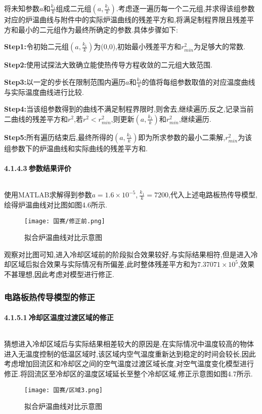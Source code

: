 \documentclass[12pt]{ctexart}
\numberwithin{figure}{section}
\numberwithin{table}{section}
\begin{document}
将未知参数$a$和$\frac{k_1}{k}$组成二元组$(a,\frac{k_1}{k})$.考虑逐一遍历每一个二元组,并求得该组参数对应的炉温曲线与附件中的实际炉温曲线的残差平方和,将满足制程界限且残差平方和最小的二元组作为最终所确定的参数.具体步骤如下:\

\textbf{Step1:}令初始二元组$(a,\frac{k_1}{k})$为(0,0),初始最小残差平方和$r^2_{min}$为足够大的常数.

\textbf{Step2:}使用试探法大致确立能使热传导方程收敛的二元组大致范围.

\textbf{Step3:}以一定的步长在限制范围内遍历$a$和$\frac{k_1}{k}$的值将每组参数取值的对应温度曲线与实际温度曲线进行比较.

\textbf{Step4:}当该组参数得到的曲线不满足制程界限时,则舍去,继续遍历;反之,记录当前二曲线的残差平方和$r^2$,若$r^2<r^2_{min}$,则更新$(a,\frac{k_1}{k})$和$r^2_{min}$,继续遍历.

\textbf{Step5:}所有遍历结束后,最终所得的$(a,\frac{k_1}{k})$即为所求参数的最小二乘解,$r^2_{min}$为该组参数下的炉温曲线和实际曲线的残差平方和.


\paragraph{4.1.4.3$\ $参数结果评价}$\ $

使用MATLAB求解得到参数$a=1.6\times10^{-5}$,$\ \frac{k_1}{k}=7200$,代入上述电路板热传导模型,绘得炉温曲线对比图如图4.6所示.
\begin{figure}[!htp]
    \centering
    \setlength{\belowcaptionskip}{0pt}
    \texttt{[image: 国赛/修正前.png]}
    \caption{拟合炉温曲线对比示意图}
    \label{tab:图1}
\end{figure}

观察对比图可知,进入冷却区域前的阶段拟合效果较好,与实际结果相符,但是进入冷却区域后拟合效果与实际情况有所偏差,此时整体残差平方和为$7.37071\times10^5$,效果不甚理想,因此考虑对模型进行修正.
\subsubsection{电路板热传导模型的修正}
\paragraph{4.1.5.1$\ $冷却区温度过渡区域的修正}$\ $

猜想进入冷却区域后与实际结果相差较大的原因是,在实际情况中温度较高的物体进入无温度控制的低温区域时,该区域内空气温度重新达到稳定的时间会较长,因此考虑增加回流区和冷却区之间的空气温度过渡区域长度,对空气温度变化模型进行修正.将回流区至冷却区的温度区域延长至整个冷却区域,修正示意图如图4.7所示.
\begin{figure}[!htp]
    \centering
    \setlength{\belowcaptionskip}{0pt}
    \texttt{[image: 国赛/区域3.png]}
    \caption{拟合炉温曲线对比示意图}
    \label{tab:图1}
\end{figure}
\end{document}
